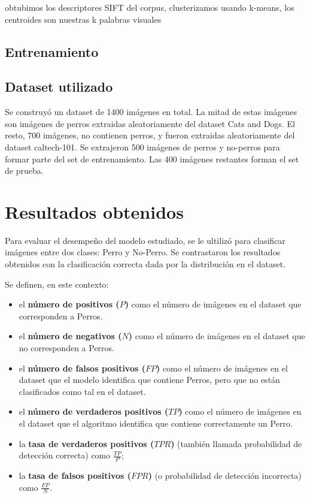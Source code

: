 \documentclass[12pt]{article}
\begin{document}
obtubimos los descriptores SIFT del corpus, clusterizamos usando k-means, los centroides son nuestras k palabras visuales

\subsection{Entrenamiento}

\subsection{Dataset utilizado}
Se construyó un dataset de 1400 imágenes en total. La mitad de estas imágenes son imágenes de perros extraidas aleatoriamente del dataset Cats and Dogs. 
El resto, 700 imágenes, no contienen perros, y fueron extraidas aleatoriamente del dataset caltech-101.
Se extrajeron 500 imágenes de perros y no-perros para formar parte del set de entrenamiento.
Las 400 imágenes restantes forman el set de prueba.

\section{Resultados obtenidos}

Para evaluar el desempeño del modelo estudiado, se le ultilizó para clasificar imágenes entre dos clases:
Perro y No-Perro. Se contrastaron los resultados obtenidos con la clasificación correcta dada por la distribución en el dataset.

Se definen, en este contexto: 

\begin{itemize}
    \item el \textbf{número de positivos ($P$)} como el número de imágenes en el dataset
        que corresponden a Perros.
    \item el \textbf{número de negativos ($N$)} como el número de imágenes en el dataset
        que no corresponden a Perros.
    \item el \textbf{número de falsos positivos ($FP$)} como el número de
        imágenes en el dataset que el modelo identifica que contiene Perros, pero que no
        están clasificados como tal en el dataset.
    \item el \textbf{número de verdaderos positivos ($TP$)} como el número de
        imágenes en el dataset que el algoritmo identifica que contiene correctamente un Perro.
    \item la \textbf{tasa de verdaderos positivos ($TPR$)} (también llamada
        probabilidad de detección correcta) como $\frac{TP}{P}$;
    \item la \textbf{tasa de falsos positivos ($FPR$)} (o probabilidad de
        detección incorrecta) como $\frac{FP}{N}$.
\end{itemize}
\end{document}
